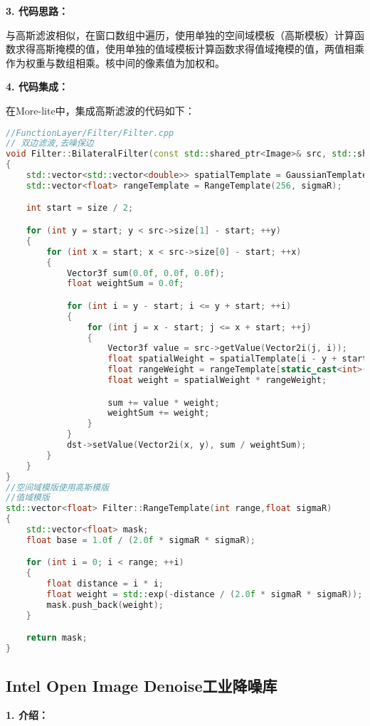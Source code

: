 \documentclass[lang=cn,10pt]{elegantbook}
\begin{document}
\textcolor{third}{\textbf{3. 代码思路：}}

与高斯滤波相似，在窗口数组中遍历，使用单独的空间域模板（高斯模板）计算函数求得高斯掩模的值，使用单独的值域模板计算函数求得值域掩模的值，两值相乘作为权重与数组相乘。核中间的像素值为加权和。

\textcolor{third}{\textbf{4. 代码集成：}}

在More-lite中，集成高斯滤波的代码如下：
\begin{lstlisting}[language=c++]
//FunctionLayer/Filter/Filter.cpp
// 双边滤波,去噪保边
void Filter::BilateralFilter(const std::shared_ptr<Image>& src, std::shared_ptr<Image>& dst, int size, float sigmaD, float sigmaR)
{
    std::vector<std::vector<double>> spatialTemplate = GaussianTemplate(size, sigmaD);
    std::vector<float> rangeTemplate = RangeTemplate(256, sigmaR);

    int start = size / 2;

    for (int y = start; y < src->size[1] - start; ++y)
    {
        for (int x = start; x < src->size[0] - start; ++x)
        {
            Vector3f sum(0.0f, 0.0f, 0.0f);
            float weightSum = 0.0f;

            for (int i = y - start; i <= y + start; ++i)
            {
                for (int j = x - start; j <= x + start; ++j)
                {
                    Vector3f value = src->getValue(Vector2i(j, i));
                    float spatialWeight = spatialTemplate[i - y + start][j - x + start];
                    float rangeWeight = rangeTemplate[static_cast<int>(std::abs(value.length()))];
                    float weight = spatialWeight * rangeWeight;

                    sum += value * weight;
                    weightSum += weight;
                }
            }
            dst->setValue(Vector2i(x, y), sum / weightSum);
        }
    }
}
//空间域模版使用高斯模版
//值域模版
std::vector<float> Filter::RangeTemplate(int range,float sigmaR)
{
    std::vector<float> mask;
    float base = 1.0f / (2.0f * sigmaR * sigmaR);

    for (int i = 0; i < range; ++i)
    {
        float distance = i * i;
        float weight = std::exp(-distance / (2.0f * sigmaR * sigmaR));
        mask.push_back(weight);
    }

    return mask;
}
\end{lstlisting}


\subsection{Intel Open Image Denoise工业降噪库}
\textcolor{third}{\textbf{1. 介绍：}}
\end{document}
